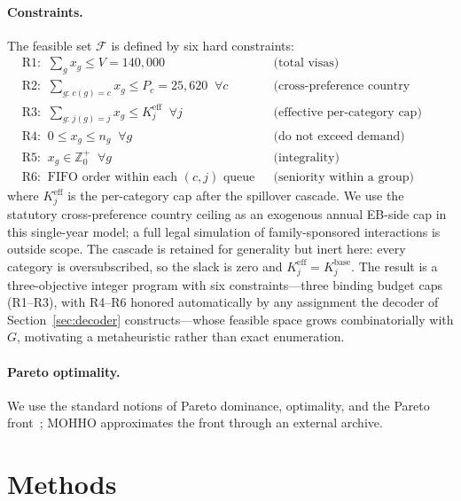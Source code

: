 \documentclass[runningheads]{llncs}
\begin{document}
\paragraph{Constraints.}
The feasible set $\mathcal{F}$ is defined by six hard constraints:
\begin{align}
&\text{R1:}\;\; \textstyle\sum_{g} x_g \le V = 140{,}000 && \text{(total visas)}\nonumber\\
&\text{R2:}\;\; \textstyle\sum_{g:\,c(g)=c} x_g \le P_c = 25{,}620 \;\;\forall c && \text{(cross-preference country ceiling)}\nonumber\\
&\text{R3:}\;\; \textstyle\sum_{g:\,j(g)=j} x_g \le K_j^{\text{eff}} \;\;\forall j && \text{(effective per-category cap)}\nonumber\\
&\text{R4:}\;\; 0 \le x_g \le n_g \;\;\forall g && \text{(do not exceed demand)}\nonumber\\
&\text{R5:}\;\; x_g \in \mathbb{Z}^{+}_0 \;\;\forall g && \text{(integrality)}\nonumber\\
&\text{R6:}\;\; \text{FIFO order within each } (c,j) \text{ queue} && \text{(seniority within a group)}\nonumber
\end{align}
where $K_j^{\text{eff}}$ is the per-category cap after the spillover cascade. We use the statutory cross-preference country ceiling as an exogenous annual EB-side cap in this single-year model; a full legal simulation of family-sponsored interactions is outside scope. The cascade is retained for generality but inert here: every category is oversubscribed, so the slack is zero and $K_j^{\text{eff}}=K_j^{\text{base}}$. The result is a three-objective integer program with six constraints---three binding budget caps (R1--R3), with R4--R6 honored automatically by any assignment the decoder of Section~\ref{sec:decoder} constructs---whose feasible space grows combinatorially with $G$, motivating a metaheuristic rather than exact enumeration.

\paragraph{Pareto optimality.}
We use the standard notions of Pareto dominance, optimality, and the Pareto front~\cite{coello}; MOHHO approximates the front through an external archive.

\section{Methods}
\label{sec:methods}
\end{document}
